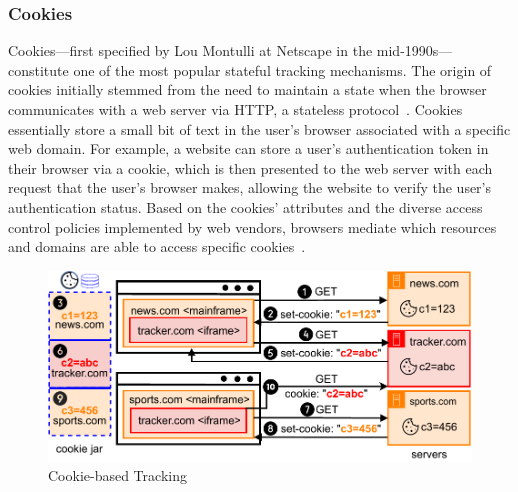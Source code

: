 \subsubsection{Cookies} Cookies---first specified by Lou Montulli at Netscape in the mid-1990s---constitute one of the most popular stateful tracking mechanisms. 
%
The origin of cookies initially stemmed from the need to maintain a state when the browser communicates with a web server via HTTP, a stateless protocol~\cite{kristolHTTPCookiesStandards2001}. 
%
Cookies essentially store a small bit of text in the user’s browser associated with a specific web domain. 
%
For example, a website can store a user’s authentication token in their browser via a cookie, which is then presented to the web server with each request that the user’s browser makes, allowing the website to verify the user’s authentication status. 
%
Based on the cookies' attributes and the diverse access control policies implemented by web vendors, browsers mediate which resources and domains are able to access specific cookies~\cite{beugin2024WebAlmanac2024,singhIncoherenciesWebBrowser2010,mdnSameoriginPolicySecurity2024}.

\begin{figure}
    \centering
    \includegraphics[width=1\linewidth]{figures/tracking-mechanisms-cookie.pdf}
    \caption{Cookie-based Tracking}
    \label{subfig:cookie-tracking}
\end{figure}

